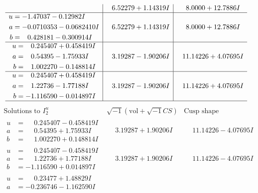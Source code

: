 \documentclass[1p]{elsarticle_modified}
\theoremstyle{definition}
\newcommand{\I}{\sqrt{-1}}
\begin{document}
$$\begin{array}{c|c|c}
 & \phantom{-}6.52279 + 1.14319 I & \phantom{-}8.0000 + 12.7886 I \\ \hline\begin{aligned}
u &= -1.47037 - 0.12982 I \\
a &= -0.0710353 - 0.0682410 I \\
b &= \phantom{-}0.428181 - 0.300914 I\end{aligned}
 & \phantom{-}6.52279 + 1.14319 I & \phantom{-}8.0000 + 12.7886 I \\ \hline\begin{aligned}
u &= \phantom{-}0.245407 + 0.458419 I \\
a &= \phantom{-}0.54395 - 1.75933 I \\
b &= \phantom{-}1.002270 - 0.148814 I\end{aligned}
 & \phantom{-}3.19287 - 1.90206 I & \phantom{-}11.14226 + 4.07695 I \\ \hline\begin{aligned}
u &= \phantom{-}0.245407 + 0.458419 I \\
a &= \phantom{-}1.22736 - 1.77188 I \\
b &= -1.116590 - 0.014897 I\end{aligned}
 & \phantom{-}3.19287 - 1.90206 I & \phantom{-}11.14226 + 4.07695 I\\
 \hline 
 \end{array}$$\newpage$$\begin{array}{c|c|c}  
\text{Solutions to }I^u_{2}& \I (\text{vol} + \sqrt{-1}CS) & \text{Cusp shape}\\
 \hline 
\begin{aligned}
u &= \phantom{-}0.245407 - 0.458419 I \\
a &= \phantom{-}0.54395 + 1.75933 I \\
b &= \phantom{-}1.002270 + 0.148814 I\end{aligned}
 & \phantom{-}3.19287 + 1.90206 I & \phantom{-}11.14226 - 4.07695 I \\ \hline\begin{aligned}
u &= \phantom{-}0.245407 - 0.458419 I \\
a &= \phantom{-}1.22736 + 1.77188 I \\
b &= -1.116590 + 0.014897 I\end{aligned}
 & \phantom{-}3.19287 + 1.90206 I & \phantom{-}11.14226 - 4.07695 I \\ \hline\begin{aligned}
u &= \phantom{-}0.23477 + 1.48829 I \\
a &= -0.236746 - 1.162590 I \\

\end{aligned}
\end{array}$$
\end{document}
